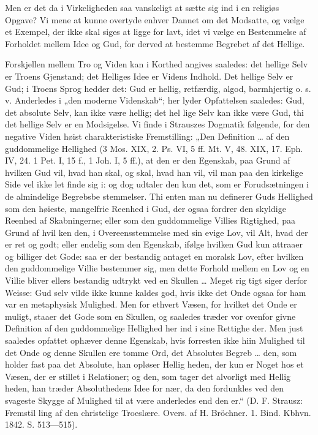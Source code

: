 \documentclass[12pt]{book}
\newcommand{\opage}[1]{\marginnote{\footnotesize\textit{[#1]}}}
\begin{document}
Men er det da i Virkeligheden saa vanskeligt at
sætte sig ind i en religiøs Opgave? Vi mene at kunne
overtyde enhver Dannet om det Modsatte, og vælge et
Exempel, der ikke skal siges at ligge for lavt, idet vi
vælge en Bestemmelse af Forholdet mellem Idee og Gud,
for derved at bestemme Begrebet af det Hellige.

Forskjellen mellem Tro og Viden kan i Korthed
angives saaledes: det hellige Selv er Troens Gjenstand;
det Helliges Idee er Videns Indhold. Det hellige Selv
er Gud; i Troens Sprog hedder det: Gud er hellig,
retfærdig, algod, barmhjertig o. s. v. Anderledes i „den
moderne Videnskab“; her lyder Opfattelsen saaledes:
Gud, det absolute Selv, kan ikke være hellig; det hel\-%
lige Selv kan ikke være Gud, thi det hellige Selv er en
Modsigelse. Vi finde i Strauszes Dogmatik følgende, for
\opage{110}\setcounter{footnote}{0}%
den negative Viden høist charakteristiske Fremstilling:
„Den Definition \ldots{} af den guddommelige Hellighed
(3 Mos. XIX, 2. Ps. VI, 5 ff. Mt. V, 48. XIX, 17.
Eph. IV, 24. 1 Pet. I, 15 f., 1 Joh. I, 5 ff.), at den er
den Egenskab, paa Grund af hvilken Gud vil, hvad han
skal, og skal, hvad han vil, vil man paa den kirkelige
Side vel ikke let finde sig i: og dog udtaler den kun
det, som er Forudsætningen i de almindelige Begrebsbe\-%
stemmelser. Thi enten man nu definerer Guds Hellighed
som den høieste, mangelfrie Reenhed i Gud, der ogsaa
fordrer den skyldige Reenhed af Skabningerne; eller som
den guddommelige Villies Rigtighed, paa Grund af hvil\-%
ken den, i Overeensstemmelse med sin evige Lov, vil
Alt, hvad der er ret og godt; eller endelig som den
Egenskab, ifølge hvilken Gud kun attraaer og billiger
det Gode: saa er der bestandig antaget en moralsk Lov,
efter hvilken den guddommelige Villie bestemmer sig,
men dette Forhold mellem en Lov og en Villie bliver
ellers bestandig udtrykt ved en Skullen \ldots{} Meget rig\-%
tigt siger derfor Weisse: Gud selv vilde ikke kunne
kaldes god, hvis ikke det Onde ogsaa for ham var en
metaphysisk Mulighed. Men for ethvert Væsen, for
hvilket det Onde er muligt, staaer det Gode som en
Skullen, og saaledes træder vor ovenfor givne Definition
af den guddommelige Hellighed her ind i sine Rettighe\-%
der. Men just saaledes opfattet ophæver denne Egenskab,
hvis forresten ikke hiin Mulighed til det Onde og denne
Skullen ere tomme Ord, det Absolutes Begreb \ldots{} den,
som holder fast paa det Absolute, han opløser Hellig\-%
heden, der kun er Noget hos et Væsen, der er stillet i
Relationer; og den, som tager det alvorligt med Hellig\-%
heden, han træder Absoluthedens Idee for nær, da den
fordunkles ved den svageste Skygge af Mulighed til at
være anderledes end den er.“ (D. F. Strausz: Fremstil\-%
\opage{111}\setcounter{footnote}{0}%
ling af den christelige Troeslære. Overs. af H. Bröchner.
1. Bind. Kbhvn. 1842. S. 513---515).
\end{document}
